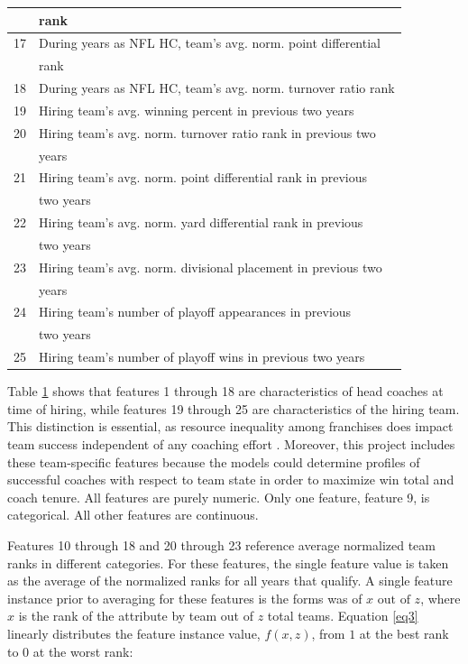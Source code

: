 \documentclass[conference]{IEEEtran}
\begin{document}
\begin{table}[htbp]
\begin{center}
\begin{tabular}{|c||l|}
&rank \\
\hline
17 & During years as NFL HC, team’s avg. norm. point differential \\
&rank \\
\hline
18 & During years as NFL HC, team’s avg. norm. turnover ratio rank \\
\hline
19 & Hiring team’s avg. winning percent in previous two years \\
\hline
20 & Hiring team’s avg. norm. turnover ratio rank in previous two \\
&years \\
\hline
21 & Hiring team’s avg. norm. point differential rank in previous\\
& two years \\
\hline
22 & Hiring team’s avg. norm. yard differential rank in previous\\
&two years \\
\hline
23 & Hiring team’s avg. norm. divisional placement in previous two\\
&years \\
\hline
24 & Hiring team’s number of playoff appearances in previous\\
&two years \\
\hline
25 & Hiring team’s number of playoff wins in previous two years \\
\hline
\end{tabular}
\label{tab1}
\end{center}
\end{table}

Table \ref{tab1} shows that features 1 through 18 are characteristics of head coaches at time of hiring, while features 19 through 25 are characteristics of the hiring team. This distinction is essential, as resource inequality among franchises does impact team success independent of any coaching effort \cite{b6}. Moreover, this project includes these team-specific features because the models could determine profiles of successful coaches with respect to team state in order to maximize win total and coach tenure. All features are purely numeric. Only one feature, feature 9, is categorical. All other features are continuous.

Features 10 through 18 and 20 through 23 reference average normalized team ranks in different categories. For these features, the single feature value is taken as the average of the normalized ranks for all years that qualify. A single feature instance prior to averaging for these features is the forms was of $x \text{ out of }z$, where $x$ is the rank of the attribute by team out of $z$ total teams. Equation \eqref{eq3} linearly distributes the feature instance value, $f(x,z)$, from $1$ at the best rank to $0$ at the worst rank:
\end{document}
